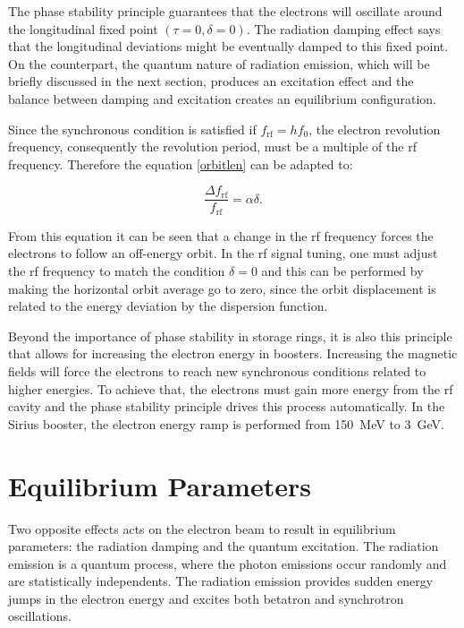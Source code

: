 The phase stability principle guarantees that the electrons will oscillate around the longitudinal fixed point $(\tau = 0, \delta = 0)$. The radiation damping effect says that the longitudinal deviations might be eventually damped to this fixed point. On the counterpart, the quantum nature of radiation emission, which will be briefly discussed in the next section, produces an excitation effect and the balance between damping and excitation creates an equilibrium configuration.

Since the synchronous condition is satisfied if $f_{\mathrm{rf}} = h f_0$, the electron revolution frequency, consequently the revolution period, must be a multiple of the \gls{rf} frequency. Therefore the equation \eqref{orbitlen} can be adapted to:

\begin{equation}
    \dfrac{\Delta f_{\mathrm{rf}}}{f_{\mathrm{rf}}} = \alpha \delta.
\end{equation}

From this equation it can be seen that a change in the \gls{rf} frequency forces the electrons to follow an off-energy orbit. In the \gls{rf} signal tuning, one must adjust the \gls{rf} frequency to match the condition $\delta = 0$ and this can be performed by making the horizontal orbit average go to zero, since the orbit displacement is related to the energy deviation by the dispersion function.

Beyond the importance of phase stability in storage rings, it is also this principle that allows for increasing the electron energy in boosters. Increasing the magnetic fields will force the electrons to reach new synchronous conditions related to higher energies. To achieve that, the electrons must gain more energy from the \gls{rf} cavity and the phase stability principle drives this process automatically. In the Sirius booster, the electron energy ramp is performed from \SI{150}{\mega \electronvolt} to \SI{3}{\giga \electronvolt}.

\section{Equilibrium Parameters}\label{equilibrium}

Two opposite effects acts on the electron beam to result in equilibrium parameters: the radiation damping and the quantum excitation. The radiation emission is a quantum process, where the photon emissions occur randomly and are statistically independents. The radiation emission provides sudden energy jumps in the electron energy and excites both betatron and synchrotron oscillations.

